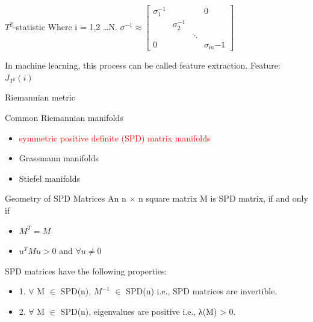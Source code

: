\documentclass[10pt]{beamer}
\begin{document}
\begin{frame}{$T^2$-statistic}
Where i = 1,2 \dots N. 
  $
                \sigma^{-1} \approx
                \begin{bmatrix}
                \sigma_1^{-1} &&&0\\
                &  \sigma_2^{-1} && \\
                && \ddots & \\
                0&&& \sigma_m{-1}
                \end{bmatrix}
  $ 
  \par
  In machine learning, this process can be called feature extraction.
  Feature:$ J_{T^2}(i)$
\end{frame}
\begin{frame}{Riemannian metric}
    \begin{exampleblock}{Common Riemannian manifolds}
	\begin{itemize}
    \item \textcolor{red}{symmetric positive definite (SPD) matrix manifolds}
    \item Grassmann manifolds
    \item Stiefel manifolds
    \end{itemize}
    \end{exampleblock}
\end{frame}
\begin{frame}{Geometry of SPD Matrices}
An n $\times$ n square matrix M is SPD matrix, if and only if
\begin{itemize}
    \item $M^T = M$
    \item $u^TMu>0$ and $\forall u \neq 0$
\end{itemize}
SPD matrices have the following properties:
\begin{itemize}
\item 1. $\forall$ M $\in$ SPD(n), $M^{-1}$ $\in$ SPD(n) i.e., SPD matrices are invertible. 
\item 2. $\forall$ M $\in$ SPD(n), eigenvalues are positive i.e., λ(M) > 0.
\end{itemize}
\end{frame}
\end{document}
